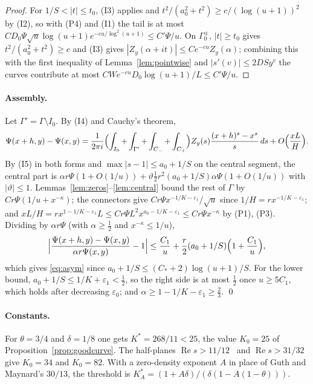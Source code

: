 \begin{proof}
For $1/S<|t|\le t_0$, (I3) applies and $t^2/(a_0^2+t^2)\ge c/(\log(u+1))^2$ by (I2), so with (P4) and (I1)
the tail is at most $CD_0\Psi\sqrt u\log(u+1)e^{-cu/\log^2(u+1)}\le C'\Psi/u$. On $\Gamma_0^\pm$, $|t|\ge t_0$
gives $t^2/(a_0^2+t^2)\ge c$ and (I3) gives $|Z_y(\alpha+it)|\le Ce^{-cu}Z_y(\alpha)$; combining this with the first
inequality of Lemma~\ref{lem:pointwise} and $|s'(v)|\le2DSy^v$ the curves contribute at most
$CWe^{-cu}D_0\log(u+1)/L\le C'\Psi/u$.
\end{proof}

\paragraph{Assembly.}
Let $\Gamma'=\Gamma\setminus I_0$. By (I4) and Cauchy's theorem,
\[
\Psi(x+h,y)-\Psi(x,y)=\frac1{2\pi i}\Bigl(\int_{I_0}+\int_{\Gamma'}+\int_{C_-}+\int_{C_+}\Bigr)
Z_y(s)\frac{(x+h)^s-x^s}{s}\,ds+O\Bigl(\frac{xL}H\Bigr).
\]
By (I5) in both forms and $\max|s-1|\le a_0+1/S$ on the central
segment, the central part is $\alpha r\Psi(1+O(1/u))+\vartheta\tfrac12r^2(a_0+1/S)\alpha\Psi(1+O(1/u))$ with
$|\vartheta|\le1$. Lemmas~\ref{lem:zeros}--\ref{lem:central} bound the rest of $\Gamma$ by
$Cr\Psi(1/u+x^{-\kappa})$; the connectors give $Cr\Psi x^{-1/K-\varepsilon_1}/\sqrt u$ since $1/H=rx^{-1/K-\varepsilon_1}$;
and $xL/H=rx^{1-1/K-\varepsilon_1}L\le Cr\Psi L^2x^{a_0-1/K-\varepsilon_1}\le Cr\Psi x^{-\kappa}$ by (P1), (P3).
Dividing by $\alpha r\Psi$ (with $\alpha\ge\tfrac12$ and $x^{-\kappa}\le1/u$),
\[
\Bigl|\frac{\Psi(x+h,y)-\Psi(x,y)}{\alpha r\Psi(x,y)}-1\Bigr|\le\frac{C_1}u+\frac r2(a_0+1/S)\Bigl(1+\frac{C_1}u\Bigr),
\]
which gives \eqref{eq:asym} since $a_0+1/S\le(C_*+2)\log(u+1)/S$. For the lower bound,
$a_0+1/S\le1/K+\varepsilon_1<\tfrac12$, so the right side is at most $\tfrac12$ once $u\ge5C_1$, which holds after
decreasing $\varepsilon_0$; and $\alpha\ge1-1/K-\varepsilon_1\ge\tfrac23$. \qed

\paragraph{Constants.}
For $\theta=3/4$ and $\delta=1/8$ one gets $K^*=268/11<25$, the value $K_0=25$ of
Proposition~\ref{prop:goodcurve}. The half-planes $\operatorname{Re}s>11/12$~\cite{Kon26} and
$\operatorname{Re}s>31/32$~\cite{CT26} give $K_0=34$ and $K_0=82$. With a zero-density exponent $A$ in place of
Guth and Maynard's $30/13$, the threshold is $K^*_A=(1+A\delta)/(\delta(1-A(1-\theta)))$.

